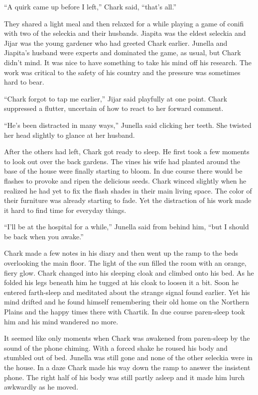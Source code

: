 ``A quirk came up before I left,'' Chark said, ``that's all.''

They shared a light meal and then relaxed for a while playing a game of conifi with two of the
seleckia and their husbands. Jiapita was the eldest seleckia and Jijar was the young gardener
who had greeted Chark earlier. Junella and Jiapita's husband were experts and dominated the
game, as usual, but Chark didn't mind. It was nice to have something to take his mind off his
research. The work was critical to the safety of his country and the pressure was sometimes hard
to bear.

``Chark forgot to tap me earlier,'' Jijar said playfully at one point. Chark suppressed a
flutter, uncertain of how to react to her forward comment.

``He's been distracted in many ways,'' Junella said clicking her teeth. She twisted her head
slightly to glance at her husband.

After the others had left, Chark got ready to sleep. He first took a few moments to look out
over the back gardens. The vines his wife had planted around the base of the house were finally
starting to bloom. In due course there would be flashes to provoke and ripen the delicious
seeds. Chark winced slightly when he realized he had yet to fix the flash shades in their main
living space. The color of their furniture was already starting to fade. Yet the distraction of
his work made it hard to find time for everyday things.

``I'll be at the hospital for a while,'' Junella said from behind him, ``but I should be back
when you awake.''

Chark made a few notes in his diary and then went up the ramp to the beds overlooking the main
floor. The light of the sun filled the room with an orange, fiery glow. Chark changed into his
sleeping cloak and climbed onto his bed. As he folded his legs beneath him he tugged at his
cloak to loosen it a bit. Soon he entered farth-sleep and meditated about the strange signal
found earlier. Yet his mind drifted and he found himself remembering their old home on the
Northern Plains and the happy times there with Chartik. In due course paren-sleep took him and
his mind wandered no more.

\spacebreak

It seemed like only moments when Chark was awakened from paren-sleep by the sound of the phone
chiming. With a forced shake he roused his body and stumbled out of bed. Junella was still gone
and none of the other seleckia were in the house. In a daze Chark made his way down the ramp to
answer the insistent phone. The right half of his body was still partly asleep and it made him
lurch awkwardly as he moved.

